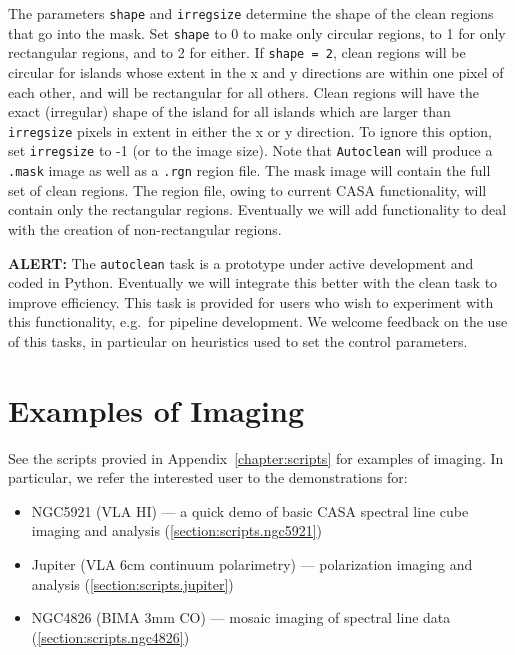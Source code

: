 The parameters {\tt shape} and {\tt irregsize} determine the shape of the clean
regions that go into the mask.  Set {\tt shape} to 0 to make only
circular regions, to 1 for only rectangular regions, and to 2 for
either.  If {\tt shape = 2}, clean regions will be circular for islands whose
extent in the x and y directions are within one pixel of each other, and will
be rectangular for all others.  Clean regions will have the exact (irregular)
shape of the island for all islands which are larger than {\tt irregsize}
pixels in extent in either the x or y direction.  To ignore this option, set
{\tt irregsize} to -1 (or to the image size).  Note that {\tt Autoclean} will
produce a {\tt .mask} image as well as a {\tt .rgn} region file.  The mask
image will contain the full set of clean regions.  The region file, owing to
current CASA functionality, will contain only the rectangular regions.
Eventually we will add functionality to deal with the creation of
non-rectangular regions.

{\bf ALERT:} The {\tt autoclean} task is a prototype under active development and
coded in Python. Eventually we will integrate this better with the
clean task to improve efficiency.  This task is provided for users who
wish to experiment with this functionality, e.g.\ for pipeline
development.  We welcome feedback on the use of this tasks, in
particular on heuristics used to set the control parameters.

\section{Examples of Imaging}
\label{section:im.examples}

See the scripts provied in Appendix~\ref{chapter:scripts} for examples of
imaging.  In particular, we refer
the interested user to the demonstrations for:
\begin{itemize}
\item NGC5921 (VLA HI) --- a quick demo of basic CASA spectral line
      cube imaging and analysis
      (\ref{section:scripts.ngc5921})
\item Jupiter (VLA 6cm continuum polarimetry) --- polarization imaging
      and analysis
      (\ref{section:scripts.jupiter})
\item NGC4826 (BIMA 3mm CO) --- mosaic imaging of spectral line data
      (\ref{section:scripts.ngc4826})
\end{itemize}

